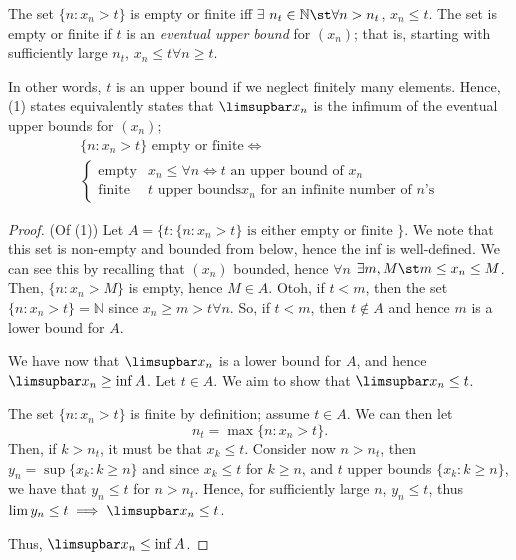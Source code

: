 \documentclass[12pt]{article}
\begin{document}
\begin{remark}
  The set $\{n : x_n > t\}$ is empty or finite iff $\exists$ $n_t \in \mathbb{N} \st \forall n > n_t$, $x_n \leq t$. The set is empty or finite if $t$ is an \emph{eventual upper bound} for $(x_n)$; that is, starting with sufficiently large $n_t$, $x_n \leq t \forall n \geq t$.

  In other words, $t$ is an upper bound if we neglect finitely many elements. Hence, (1) states equivalently states that $\limsupbar x_n$ is the infimum of the eventual upper bounds for $(x_n)$;
  \begin{align*}
    \{n : x_n > t\} \text{ empty or finite} \iff\\
    \begin{cases}
      \text{empty} & x_n \leq \forall n \iff t \text{ an upper bound of } x_n\\
      \text{finite} & t \text{ upper bounds} x_n \text{ for an infinite number of }n\text{'s}
    \end{cases}
  \end{align*}
\end{remark}

\begin{proof}(Of (1)) Let $A = \{t : \{n : x_n > t\} \text{ is either empty or finite }\}$. We note that this set is non-empty and bounded from below, hence the inf is well-defined. We can see this by recalling that $(x_n)$ bounded, hence $\forall n$ $\exists m, M \st m \leq x_n \leq M$. Then, $\{n : x_n > M\}$ is empty, hence $M \in A$. Otoh, if $t < m$, then the set $\{n : x_n > t\} = \mathbb{N}$ since $x_n \geq m > t \forall n$. So, if $t < m$, then $t \notin A$ and hence $m$ is a lower bound for $A$. 

We have now that $\limsupbar x_n$ is a lower bound for $A$, and hence $\limsupbar x_n \geq \inf A$. Let $t \in A$. We aim to show that $\limsupbar x_n \leq t$.

The set $\{n : x_n > t\}$ is finite by definition; assume $t \in A$. We can then let \[
  n_t = \max \{n : x_n > t\}.  
\]
Then, if $k > n_t$, it must be that $x_k \leq t$. Consider now $n > n_t$, then $y_n = \sup \{ x_k : k \geq n\}$ and since $x_k \leq t$ for $k \geq n$, and $t$ upper bounds $\{x_k: k \geq n\}$, we have that $y_n \leq t$ for $n > n_t$. Hence, for sufficiently large $n$, $y_n \leq t$, thus $\lim y_n \leq t \implies \limsupbar x_n \leq t$. 

Thus, $\limsupbar x_n \leq \inf A$.
\end{proof}
\end{document}

